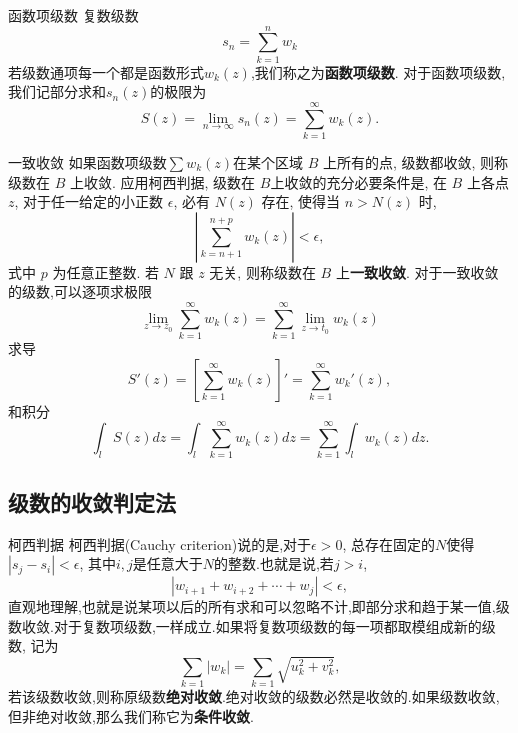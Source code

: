 \documentclass[fontset=windows, chinese, 10pt]{beamer}
\begin{document}
  

  \begin{frame}{函数项级数}
    \small 复数级数
\begin{equation*}
    s_n = \sum_{k=1}^{n} w_{k}
\end{equation*}
若级数通项每一个都是函数形式$w_k(z)$,我们称之为\textbf{函数项级数}.
对于函数项级数,我们记部分求和$s_n(z)$的极限为
\begin{equation}
    S(z) = \lim_{n\to \infty} s_n(z) =  \sum_{k=1}^{\infty} w_k (z). 
\end{equation}

\end{frame}

\begin{frame}{一致收敛}
  \small
  如果函数项级数$\sum w_k(z)$在某个区域 $B$ 上所有的点, 级数都收敛, 
则称级数在 $B$ 上收敛. 
  应用柯西判据, 级数在 $B$上收敛的充分必要条件是, 
在 $B$ 上各点 $z$, 对于任一给定的小正数 $\epsilon$, 必有 $N(z)$ 存在, 
使得当 $n>N(z)$ 时,
$$
\left|\sum_{k=n+1}^{n+p} w_k(z)\right|<\epsilon,
$$
式中 $p$ 为任意正整数. 若 $N$ 跟 $z$ 无关, 则称级数在 $B$ 上\textbf{一致收敛}.
对于一致收敛的级数,可以逐项求极限
$$
\lim _{z \rightarrow z_0} \sum_{k=1}^{\infty} w_k(z)=\sum_{k=1}^{\infty} \lim _{z \rightarrow t_0} w_k(z)
$$
求导
$$
S' (z) = [ \sum_{k=1}^{\infty} w_k(z)]' =\sum_{k=1}^{\infty}  w_k'(z),
$$
和积分
$$
\int_l S(z) dz = \int_l \sum_{k=1}^{\infty} w_k(z) dz=\sum_{k=1}^{\infty} \int_l w_k(z) dz .
$$

\end{frame}

\subsection{级数的收敛判定法}

\begin{frame}{柯西判据}
\small
柯西判据(Cauchy criterion)说的是,对于$\epsilon>0$, 总存在固定的$N$使得$|s_j - s_i|< \epsilon$, 其中$i,j$是任意大于$N$的整数.也就是说,若$j>i$,
\begin{equation}
    | w_{i+1} + w_{i+2} + \cdots + w_{j} | < \epsilon ,
\end{equation}
直观地理解,也就是说某项以后的所有求和可以忽略不计,即部分求和趋于某一值,级数收敛.对于复数项级数,一样成立.如果将复数项级数的每一项都取模组成新的级数,
记为
\begin{equation}
    \sum_{k=1} |w_k| = \sum_{k=1}\sqrt { u_k^2 + v_k^2},
\end{equation}
若该级数收敛,则称原级数\textbf{绝对收敛}.绝对收敛的级数必然是收敛的.如果级数收敛,但非绝对收敛,那么我们称它为\textbf{条件收敛}.

\end{frame}
\end{document}

